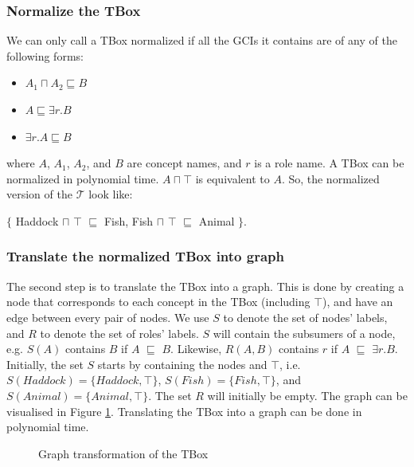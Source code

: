 \subsubsection{Normalize the TBox}
We can only call a TBox normalized if all the GCIs it contains are of any of the following forms:
\begin{itemize}
\item $A_1 \sqcap A_2 \sqsubseteq B$
\item $A \sqsubseteq \exists r.B$
\item $\exists r.A \sqsubseteq B$
\end{itemize}
where $A$, $A_1$, $A_2$, and $B$ are concept names, and $r$ is a role name. A TBox can be normalized in polynomial time. $A \sqcap \top$ is equivalent to $A$. So, the normalized version of the $\mathcal{T}$ look like:
\begin{center}
$\lbrace$ Haddock $\sqcap$ $\top$ $\sqsubseteq$ Fish, Fish $\sqcap$ $\top$ $\sqsubseteq$ Animal $\rbrace$.
\end{center}

\subsubsection{Translate the normalized TBox into graph}
The second step is to translate the TBox into a graph. This is done by creating a node that corresponds to each concept in the TBox (including $\top$), and have an edge between every pair of nodes. We use $S$ to denote the set of nodes' labels, and $R$ to denote the set of roles' labels. $S$ will contain the subsumers of a node, e.g. $S(A)$ contains $B$ if $A$ $\sqsubseteq$ $B$. Likewise, $R(A, B)$ contains $r$ if $A$ $\sqsubseteq$ $\exists r.B$. Initially, the set $S$ starts by containing the nodes and $\top$, i.e. $S(Haddock)= \lbrace Haddock, \top \rbrace$, $S(Fish) = \lbrace Fish, \top \rbrace$, and $S(Animal)= \lbrace Animal , \top \rbrace$. The set $R$ will initially be empty. The graph can be visualised in Figure \ref{hdk}. Translating the TBox into a graph can be done in polynomial time.

\begin{figure}
\centering
{}
\caption{Graph transformation of the TBox}
\label{hdk}
\end{figure}


